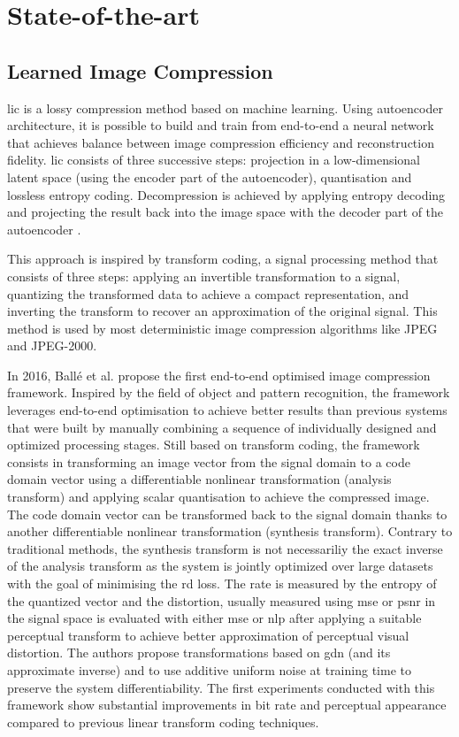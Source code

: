 \chapter{State-of-the-art}
\label{sota}

\section{Learned Image Compression}
\acrfull{lic} is a lossy compression method based on machine learning. Using autoencoder architecture, it is possible to build and train from end-to-end a neural network that achieves balance between image compression efficiency and reconstruction fidelity. \acrshort{lic} consists of three successive steps: projection in a low-dimensional latent space (using the encoder part of the autoencoder), quantisation and lossless entropy coding. Decompression is achieved by applying entropy decoding and projecting the result back into the image space with the decoder part of the autoencoder \cite{licmedium, licstanford}.

This approach is inspired by transform coding, a signal processing method that consists of three steps: applying an invertible transformation to a signal, quantizing the transformed data to achieve a compact representation, and inverting the transform to recover an approximation of the original signal. This method is used by most deterministic image compression algorithms like JPEG and JPEG-2000.

In 2016, Ballé et al. \cite{ballé2016endtoendoptimizationnonlineartransform} propose the first end-to-end optimised image compression framework. Inspired by the field of object and pattern recognition, the framework leverages end-to-end optimisation to achieve better results than previous systems that were built by manually combining a sequence of individually designed and optimized processing stages. Still based on transform coding, the framework consists in transforming an image vector from the signal domain to a code domain vector using a differentiable nonlinear transformation (analysis transform) and applying scalar quantisation to achieve the compressed image. The code domain vector can be transformed back to the signal domain thanks to another differentiable nonlinear transformation (synthesis transform). Contrary to traditional methods, the synthesis transform is not necessariliy the exact inverse of the analysis transform as the system is jointly optimized over large datasets with the goal of minimising the \acrfull{rd} loss. The rate is measured by the entropy of the quantized vector and the distortion, usually measured using \acrshort{mse} or \acrshort{psnr} in the signal space is evaluated with either \acrshort{mse} or \acrfull{nlp} after applying a suitable perceptual transform to achieve better approximation of perceptual visual distortion. The authors propose transformations based on \acrfull{gdn} (and its approximate inverse) and to use additive uniform noise at training time to preserve the system differentiability. The first experiments conducted with this framework show substantial improvements in bit rate and perceptual appearance compared to previous linear transform coding techniques.

